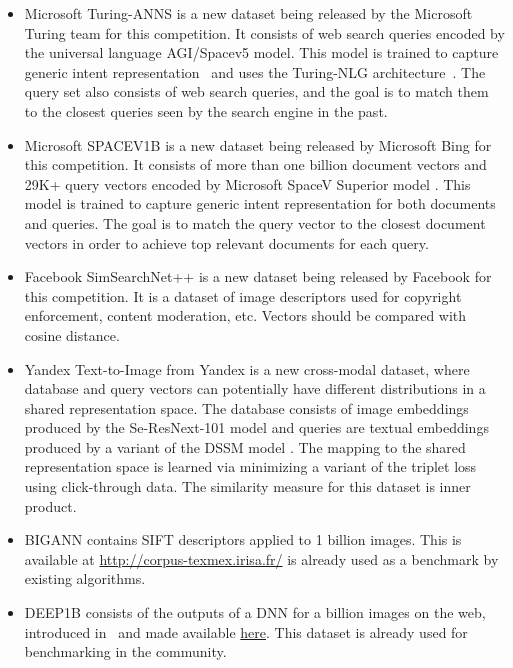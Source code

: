 \begin{itemize}
  \item \textsf{Microsoft Turing-ANNS} is a new dataset being released by the
    Microsoft Turing team for this competition. It consists of web
    search queries encoded by the universal language AGI/Spacev5
    model. This model is trained to capture generic intent
    representation~\cite{AGIv4} and uses the Turing-NLG
    architecture~\cite{Turing-NLG}. The query set also consists of web
    search queries, and the goal is to match them to the closest
    queries seen by the search engine in the past.
  \item \textsf{Microsoft SPACEV1B} is a new dataset being released by
    Microsoft Bing for this competition. It consists of more than one
    billion document vectors and 29K+ query vectors encoded by
    Microsoft SpaceV Superior model . This model is trained to capture
    generic intent representation for both documents and queries. The
    goal is to match the query vector to the closest document vectors
    in order to achieve top relevant documents for each query.
  \item \textsf{Facebook SimSearchNet++} is a new dataset being released by
    Facebook  for this competition. It is a dataset of image descriptors 
    used for copyright enforcement, content moderation, etc.
    Vectors should be compared with cosine distance. 
  \item \textsf{Yandex Text-to-Image} from Yandex is a new cross-modal dataset,
    where database and query vectors can potentially have different
    distributions in a shared representation space. The database
    consists of image embeddings produced by the Se-ResNext-101 model
    \cite{hu2018squeeze} and queries are textual embeddings produced
    by a variant of the DSSM model \cite{huang2013learning}. The
    mapping to the shared representation space is learned via
    minimizing a variant of the triplet loss using click-through data. The similarity measure for this dataset is inner product.
  \item \textsf{BIGANN} contains SIFT descriptors applied
    to 1 billion images. This is available at
    \url{http://corpus-texmex.irisa.fr/} is already used as a
    benchmark by existing algorithms. 
  \item \textsf{DEEP1B} consists of the outputs of a DNN for a
    billion images on the web, introduced in~\cite{deep1b-link} and made
    available
    \href{https://github.com/arbabenko/GNOIMI/blob/master/downloadDeep1B.py}{here}. This
    dataset is already used for benchmarking in the community.
\end{itemize}

